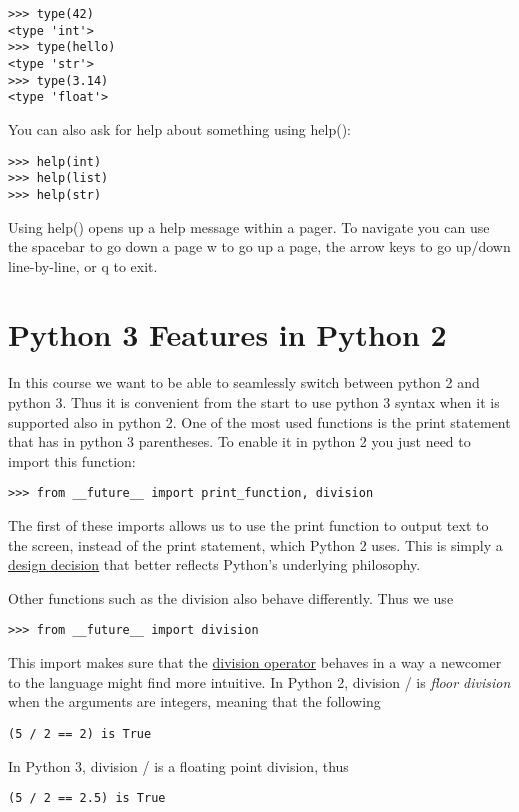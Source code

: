 \begin{lstlisting}
>>> type(42)
<type 'int'>
>>> type(hello)
<type 'str'>
>>> type(3.14)
<type 'float'>
\end{lstlisting}


You can also ask for help about something using help():

\begin{lstlisting}
>>> help(int)
>>> help(list)
>>> help(str)
\end{lstlisting}

Using help() opens up a help message within a pager. To navigate you
can use the spacebar to go down a page w to go up a page, the arrow
keys to go up/down line-by-line, or q to exit.

\section{Python 3 Features in Python 2}\label{python-3-features-in-python-2}

In this course we want to be able to seamlessly switch between python 2
and python 3. Thus it is convenient from the start to use python 3
syntax when it is supported also in python 2. One of the most used
functions is the print statement that has in python 3 parentheses. To
enable it in python 2 you just need to import this function:

\begin{lstlisting}
>>> from __future__ import print_function, division
\end{lstlisting}

The first of these imports allows us to use the print function to output
text to the screen, instead of the print statement, which Python 2 uses.
This is simply a \href{https://www.python.org/dev/peps/pep-3105/}{design
decision} that better reflects Python's underlying philosophy.


Other functions such as the division also behave differently. Thus we use

\begin{lstlisting}
>>> from __future__ import division
\end{lstlisting}

This import makes sure that the
\href{https://www.python.org/dev/peps/pep-0238/}{division operator}
behaves in a way a newcomer to the language might find more
intuitive.  In Python 2, division / is \emph{floor division} when the
arguments are integers, meaning that the following 

\begin{lstlisting}
(5 / 2 == 2) is True
\end{lstlisting}

In Python 3, division / is a floating point division, thus 

\begin{lstlisting}
(5 / 2 == 2.5) is True
\end{lstlisting}